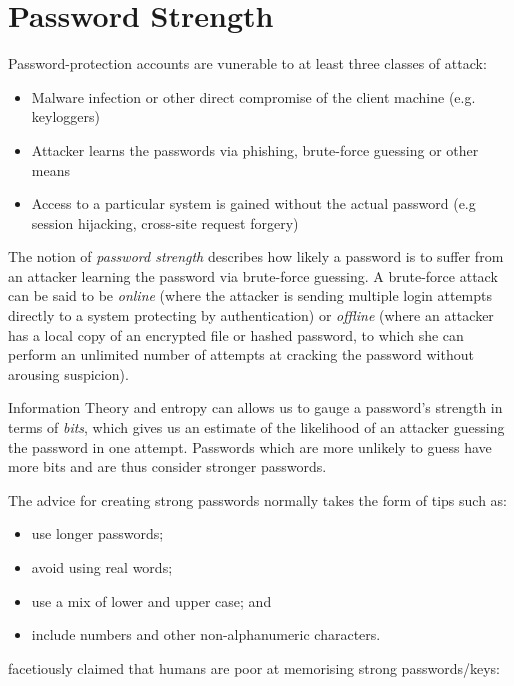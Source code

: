 \documentclass{report}
\begin{document}
\section{Password Strength}

Password-protection accounts are vunerable to at least three
classes of attack\parencite{florencio2014password}:

\begin{itemize}
  \item Malware infection or other direct compromise of the client machine (e.g. keyloggers)
  \item Attacker learns the passwords via phishing, brute-force guessing or other means
  \item Access to a particular system is gained without the actual password (e.g session hijacking, cross-site request forgery)
\end{itemize}

The notion of \emph{password strength} describes how likely
a password is to suffer from an attacker learning the password via brute-force
guessing. A brute-force attack can be said to be \emph{online} (where the
attacker is sending multiple login attempts directly to a system protecting
by authentication) or \emph{offline} (where an attacker has a local copy of
an encrypted file or hashed password, to which she can perform an unlimited
number of attempts at cracking the password without arousing suspicion).

Information Theory and entropy can allows us to gauge a password's strength
in terms of \emph{bits}, which gives us an estimate of the likelihood of
an attacker guessing the password in one attempt. Passwords which are
more unlikely to guess have more bits and are thus consider stronger passwords.

The advice for creating strong passwords normally takes the form of tips
such as:

\begin{itemize}
  \item use longer passwords;
  \item avoid using real words;
  \item use a mix of lower and upper case; and
  \item include numbers and other non-alphanumeric characters.
\end{itemize}

\cite{kaufman2002network} facetiously claimed that humans are poor
at memorising strong passwords/keys:
\end{document}

